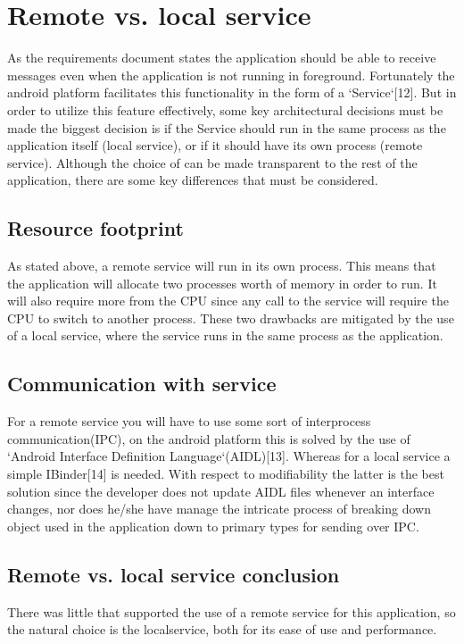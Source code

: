

\section{Remote vs. local service}

As the requirements document states the application should be able to receive messages even when the application is not running in foreground. Fortunately the android platform facilitates this functionality in the form of a `Service`[12]. But in order to utilize this feature effectively, some key architectural decisions must be made the biggest decision is if the Service should run in the same process as the application itself (local service), or if it should have its own process (remote service). Although the choice of can be made transparent to the rest of the application, there are some key differences that must be considered.

\subsection{Resource footprint}
As stated above, a remote service will run in its own process. This means that the application will allocate two processes worth of memory in order to run. It will also require more from the CPU since any call to the service will require the CPU to switch to another process. These two drawbacks are mitigated by the use of a local service, where the service runs in the same process as the application. 

\subsection{Communication with service}
For a remote service you will have to use some sort of  interprocess communication(IPC), on the android platform this is solved by the use of `Android Interface Definition Language`(AIDL)[13]. Whereas for a local service a simple IBinder[14] is needed. With respect to modifiability the latter is the best solution since the developer does not update AIDL files whenever an interface changes, nor does he/she have manage the intricate process of breaking down object used in the application down to primary types for sending over IPC.

\subsection{Remote vs. local service conclusion}
There was little that supported the use of a remote service for this application, so the natural choice is the localservice, both for its ease of use and performance.



